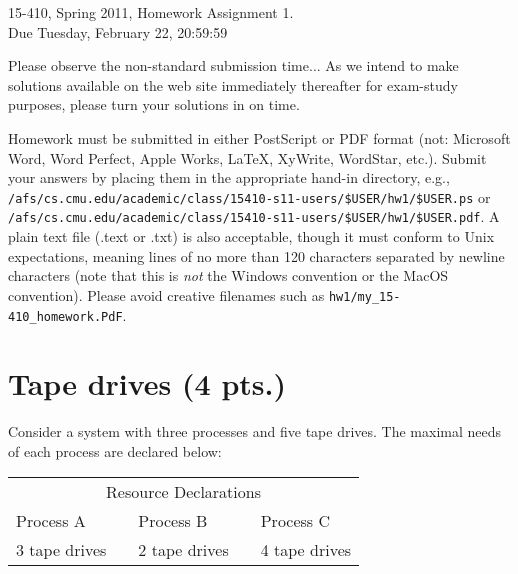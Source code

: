 \documentclass{article}
\def\titledquestion#1#2{\section{ {#1} ({#2} pts.)}}
\begin{document}
\begin{center}{\large 15-410, Spring 2011, Homework Assignment 1.} \\
\Large{Due Tuesday, February 22, 20:59:59}
\end{center}


{\small Please} observe the {\large non-standard} {\Large submission} {\LARGE time}...
As we intend to make solutions available on the web site immediately
thereafter for exam-study purposes, please turn your solutions
in on time.

Homework must be submitted in either PostScript or PDF format (not:
Microsoft Word, Word Perfect, Apple Works, LaTeX, XyWrite, WordStar,
etc.).  Submit your answers by placing them in the appropriate
hand-in directory, e.g.,
{\tt /afs/cs.cmu.edu/academic/class/15410-s11-users/\$USER/hw1/\$USER.ps} or
{\tt /afs/cs.cmu.edu/academic/class/15410-s11-users/\$USER/hw1/\$USER.pdf}.
A plain text file (.text or .txt) is also acceptable, though it must conform to Unix
expectations,
meaning lines of no more than 120 characters separated by newline characters
(note that this is {\em not} the Windows convention or the MacOS convention).
Please avoid creative filenames such as {\tt hw1/my\_15-410\_homework.PdF}.

\titledquestion{Tape drives}{4}

Consider a system with
  three processes and
  five tape drives.
The maximal needs of each process are declared below:

\begin{tabular}[b]{|l|c|l|c|l|}
\multicolumn{5}{c}{Resource Declarations} \\
\cline{1-1} \cline{3-3} \cline{5-5}
Process A && Process B && Process C \\
\cline{1-1} \cline{3-3} \cline{5-5}
3 tape drives && 2 tape drives && 4 tape drives \\
\cline{1-1} \cline{3-3} \cline{5-5}
\end{tabular}
\end{document}
